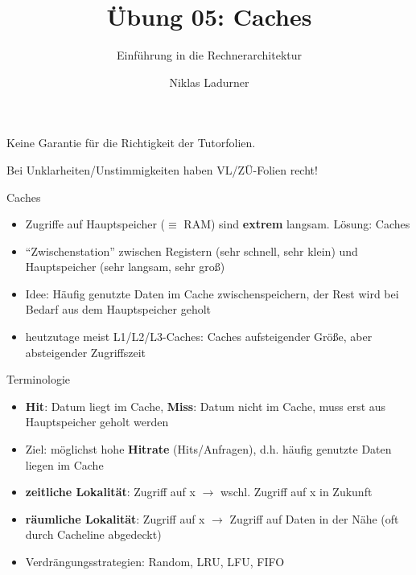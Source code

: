 \documentclass[
  german,            %
  aspectratio=169,    %
]{tumbeamer}
\title{Übung 05: Caches}
\subtitle{Einführung in die Rechnerarchitektur}
\author{Niklas Ladurner}
\institute{\theChairName\\\theDepartmentName\\\theUniversityName}
\date{\DTMdisplaydate{2024}{11}{15}{-1}}
\begin{document}
\maketitle

\begin{frame}[c, fragile]{}{}
  \begin{center}
    \LARGE  Keine Garantie für die Richtigkeit der Tutorfolien.

    \Large Bei Unklarheiten/Unstimmigkeiten haben VL/ZÜ-Folien recht!
  \end{center}
\end{frame}

\begin{frame}[fragile, c]{Caches}{}
  \begin{itemize}
    \item Zugriffe auf Hauptspeicher ($\equiv$ RAM) sind \textbf{extrem} langsam. Lösung: Caches
    \item \enquote{Zwischenstation} zwischen Registern (sehr schnell, sehr klein) und Hauptspeicher (sehr langsam, sehr groß)
    \item Idee: Häufig genutzte Daten im Cache zwischenspeichern, der Rest wird bei Bedarf aus dem Hauptspeicher geholt
    \item heutzutage meist L1/L2/L3-Caches: Caches aufsteigender Größe, aber absteigender Zugriffszeit
  \end{itemize}
\end{frame}


\begin{frame}[c, fragile]{Terminologie}
  \begin{itemize}
    \item \textbf{Hit}: Datum liegt im Cache, \textbf{Miss}: Datum nicht im Cache, muss erst aus Hauptspeicher geholt werden
    \item Ziel: möglichst hohe \textbf{Hitrate} (Hits/Anfragen), d.h. häufig genutzte Daten liegen im Cache
    \item \textbf{zeitliche Lokalität}: Zugriff auf x $\rightarrow$ wschl. Zugriff auf x in Zukunft
    \item \textbf{räumliche Lokalität}: Zugriff auf x $\rightarrow$ Zugriff auf Daten in der Nähe (oft durch Cacheline abgedeckt)
    \item Verdrängungsstrategien: Random, LRU, LFU, FIFO
  \end{itemize}
\end{frame}
\end{document}
